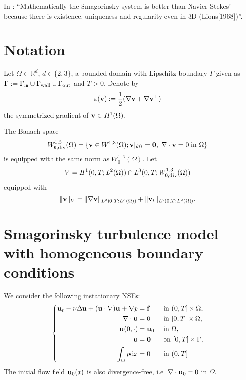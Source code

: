 \documentclass[oneside,11pt]{book}
\numberwithin{equation}{section}
\begin{document}
In \cite{Mohammadi_Pironneau1994}: ``Mathematically the Smagorinsky system is better than Navier-Stokes' because there is existence, uniqueness and regularity even in 3D (Lions[1968])''.

\section{Notation}
Let $\Omega\subset\mathbb{R}^d$, $d\in\{2,3\}$, a bounded domain with Lipschitz boundary $\Gamma$ given as $\Gamma := \Gamma_{\rm in}\cup\Gamma_{\rm wall}\cup\Gamma_{\rm out}$ and $T > 0$. Denote by
\begin{align*}
    \varepsilon({\bf v}) := \frac{1}{2}(\nabla{\bf v} + \nabla{\bf v}^\top)
\end{align*}
the symmetrized gradient of ${\bf v}\in H^1(\Omega)$.

The Banach space
\begin{align*}
    W_{0,{\rm div}}^{1,3}(\Omega) = \{{\bf v}\in W^{1,3}(\Omega);{\bf v}|_{\partial\Omega} = {\bf 0},\ \nabla\cdot{\bf v} = 0 \mbox{ in } \Omega\}
\end{align*}
is equipped with the same norm as $W_0^{1,3}(\Omega)$. Let
\begin{align*}
    V = H^1(0,T;L^2(\Omega))\cap L^3(0,T;W_{0,{\rm div}}^{1,3}(\Omega))
\end{align*}
equipped with
\begin{align*}
    \|{\bf v}\|_V = \|\nabla{\bf v}\|_{L^3(0,T;L^3(\Omega))} + \|{\bf v}_t\|_{L^2(0,T;L^2(\Omega))}.
\end{align*}

\section{Smagorinsky turbulence model with homogeneous boundary conditions}
We consider the following instationary NSEs:
\begin{equation}
    \label{instationary NSEs}
    \left\{\begin{split}
        {\bf u}_t - \nu\Delta{\bf u} + ({\bf u}\cdot\nabla){\bf u} + \nabla p &= {\bf f} &&\mbox{ in } (0,T]\times\Omega,\\
        \nabla\cdot{\bf u} &= 0 &&\mbox{ in } [0,T]\times\Omega,\\
        {\bf u}(0,\cdot) &= {\bf u}_0 &&\mbox{ in } \Omega,\\
        {\bf u} &= {\bf 0} &&\mbox{ on } [0,T]\times\Gamma,\\
        \int_\Omega p{\rm d}x &= 0 &&\mbox{ in } (0,T]
    \end{split}\right.
\end{equation}
The initial flow field ${\bf u}_0(x)$ is also divergence-free, i.e. $\nabla\cdot{\bf u}_0 = 0$ in $\Omega$.
\end{document}
